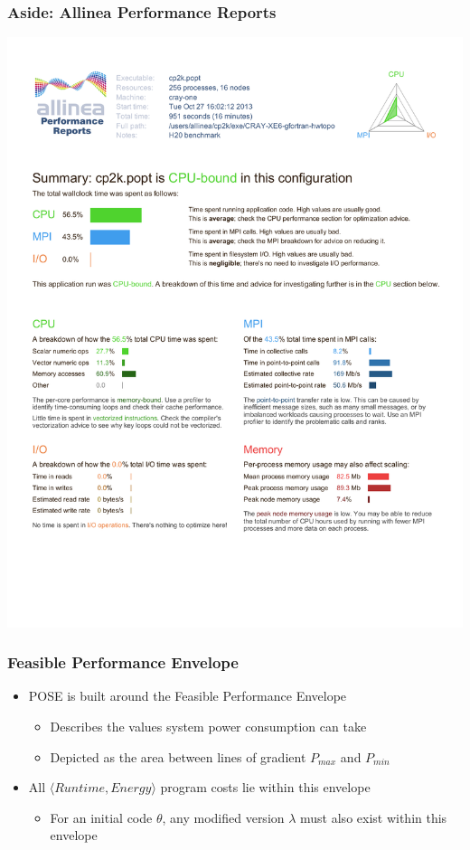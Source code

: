 \documentclass{beamer}
\begin{document}
   \begin{frame}
    \frametitle{Aside: Allinea Performance Reports}
    \begin{center}
      \includegraphics[height=0.9\textheight]{graphics/apr}
    \end{center}
   \end{frame}



  \begin{frame}
    \frametitle{Feasible Performance Envelope}
    \begin{itemize}
      \item POSE is built around the Feasible Performance Envelope
      \begin{itemize}
      \item Describes the values system power consumption can take 
      \end{itemize}
      \begin{itemize}
      \item Depicted as the area between lines of gradient $P_{max}$ and $P_{min}$
      \end{itemize}
      \item All $\langle Runtime, Energy \rangle$ program costs lie within this envelope
      \begin{itemize}
        \item For an initial code $\theta$, any modified version $\lambda$ must also exist within this envelope
      \end{itemize}
    \end{itemize}
  \end{frame}
\end{document}

